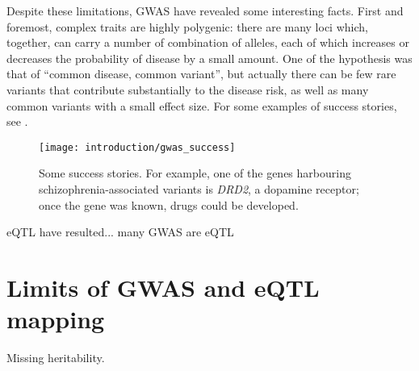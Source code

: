 \documentclass[../main.tex]{subfiles}
\begin{document}
Despite these limitations, GWAS have revealed some interesting facts. 
First and foremost, complex traits are highly 
polygenic\cite{Visscher2017}: there are many loci which, together, can 
carry a number of combination of alleles, each of which increases or 
decreases the probability of disease by a small amount. One of the 
hypothesis was that of \enquote{common disease, common variant}, but 
actually there can be few rare variants that contribute substantially to 
the disease risk, as well as many common variants with a small effect 
size. For some examples of success stories, see 
.

\begin{figure}
	\texttt{[image: introduction/gwas\_success]}
	\caption{Some success stories. For example, one of the genes 
		harbouring schizophrenia-associated variants is \textit{DRD2}, a 
		dopamine receptor; once the gene was known, drugs could be 
		developed.}
	\label{introduction/gwas_success}
\end{figure}

eQTL have resulted... many GWAS are eQTL

\section{Limits of GWAS and eQTL mapping}

Missing heritability.





\end{document}
